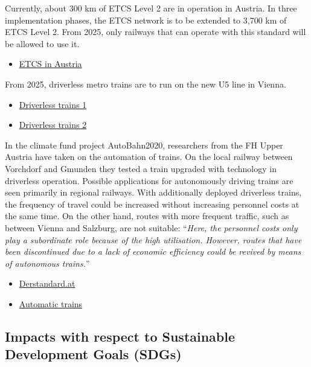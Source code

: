 \documentclass[
]{book}
\providecommand{\tightlist}{%
  \setlength{\itemsep}{0pt}\setlength{\parskip}{0pt}}
\begin{document}
Currently, about 300 km of ETCS Level 2 are in operation in Austria. In three implementation phases, the ETCS network is to be extended to 3,700 km of ETCS Level 2. From 2025, only railways that can operate with this standard will be allowed to use it.

\begin{itemize}
\tightlist
\item
  \href{https://infrastruktur.oebb.at/de/geschaeftspartner/schienennetz/dokumente-und-daten/etcs-zugbeeinflussung/etcs-ausbau}{ETCS in Austria}
\end{itemize}

From 2025, driverless metro trains are to run on the new U5 line in Vienna.

\begin{itemize}
\tightlist
\item
  \href{https://www.wienerzeitung.at/nachrichten/chronik/wien-chronik/2023966-Erster-Blick-auf-fahrerlose-U-Bahn.html}{Driverless trains 1}
\item
  \href{https://www.wienerlinien.at/web/wiener-linien/erste-u-bahn-testfahrt-mit-dem-neuen-x-wagen}{Driverless trains 2}
\end{itemize}

In the climate fund project AutoBahn2020, researchers from the FH Upper Austria have taken on the automation of trains. On the local railway between Vorchdorf and Gmunden they tested a train upgraded with technology in driverless operation. Possible applications for autonomously driving trains are seen primarily in regional railways. With additionally deployed driverless trains, the frequency of travel could be increased without increasing personnel costs at the same time. On the other hand, routes with more frequent traffic, such as between Vienna and Salzburg, are not suitable: ``\emph{Here, the personnel costs only play a subordinate role because of the high utilisation. However, routes that have been discontinued due to a lack of economic efficiency could be revived by means of autonomous trains.}''

\begin{itemize}
\item
  \href{https://www.derstandard.at/story/2000106941938/es-faehrt-ein-zug-ganz-fahrerlos}{Derstandard.at}
\item
  \href{https://www.unsereoebb.at/de/artikel/2019/automatisierter-bahnbetrieb}{Automatic trains}
\end{itemize}

\hypertarget{impacts-with-respect-to-sustainable-development-goals-sdgs-40}{%
\subsection*{Impacts with respect to Sustainable Development Goals (SDGs)}\label{impacts-with-respect-to-sustainable-development-goals-sdgs-40}}
\end{document}
